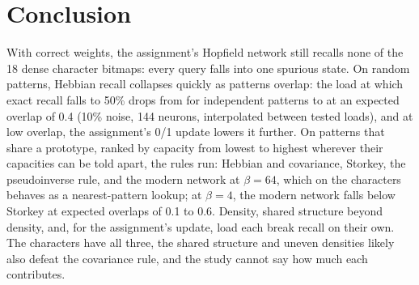 \section{Conclusion}

With correct weights, the assignment's Hopfield network still recalls none of the 18 dense character bitmaps: every query falls into one spurious state. On random patterns, Hebbian recall collapses quickly as patterns overlap: the load at which exact recall falls to 50\% drops from  for independent patterns to  at an expected overlap of 0.4 (10\% noise, 144 neurons, interpolated between tested loads), and at low overlap, the assignment's 0/1 update lowers it further. On patterns that share a prototype, ranked by capacity from lowest to highest wherever their capacities can be told apart, the rules run: Hebbian and covariance, Storkey, the pseudoinverse rule, and the modern network at $\beta = 64$, which on the characters behaves as a nearest-pattern lookup; at $\beta = 4$, the modern network falls below Storkey at expected overlaps of 0.1 to 0.6. Density, shared structure beyond density, and, for the assignment's update, load each break recall on their own. The characters have all three, the shared structure and uneven densities likely also defeat the covariance rule, and the study cannot say how much each contributes.
